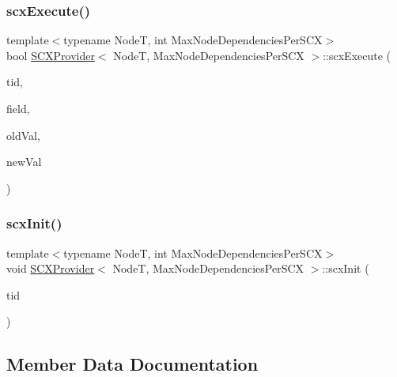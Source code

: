 \subsubsection{\texorpdfstring{scx\+Execute()}{scxExecute()}}
{\footnotesize\ttfamily template$<$typename NodeT, int Max\+Node\+Dependencies\+Per\+S\+CX$>$ \\
bool \hyperlink{classSCXProvider}{S\+C\+X\+Provider}$<$ NodeT, Max\+Node\+Dependencies\+Per\+S\+CX $>$\+::scx\+Execute (\begin{DoxyParamCaption}\item[{const int}]{tid,  }\item[{void $\ast$volatile $\ast$const}]{field,  }\item[{void $\ast$const}]{old\+Val,  }\item[{void $\ast$const}]{new\+Val }\end{DoxyParamCaption})\hspace{0.3cm}{\ttfamily [inline]}}

\mbox{\label{classSCXProvider_a43155a1068ae855fb6c0b386d2538693}} 
\subsubsection{\texorpdfstring{scx\+Init()}{scxInit()}}
{\footnotesize\ttfamily template$<$typename NodeT, int Max\+Node\+Dependencies\+Per\+S\+CX$>$ \\
void \hyperlink{classSCXProvider}{S\+C\+X\+Provider}$<$ NodeT, Max\+Node\+Dependencies\+Per\+S\+CX $>$\+::scx\+Init (\begin{DoxyParamCaption}\item[{const int}]{tid }\end{DoxyParamCaption})\hspace{0.3cm}{\ttfamily [inline]}}



\subsection{Member Data Documentation}
\mbox{\label{classSCXProvider_ab51db5cf42bf7e0e5a3dbac50db175fa}} 
